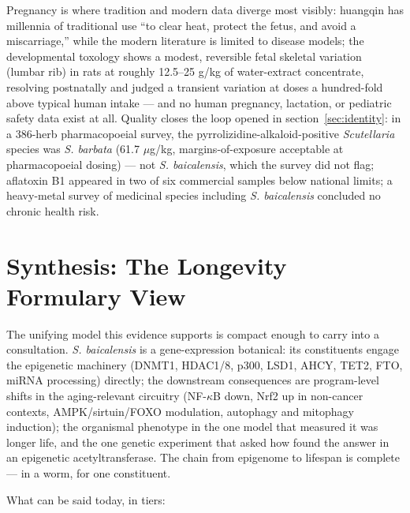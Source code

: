Pregnancy is where tradition and modern data diverge most visibly: huangqin has millennia of traditional use ``to clear heat, protect the fetus, and avoid a miscarriage,'' while the modern literature is limited to disease models; the developmental toxology shows a modest, reversible fetal skeletal variation (lumbar rib) in rats at roughly 12.5--25 g/kg of water-extract concentrate, resolving postnatally and judged a transient variation at doses a hundred-fold above typical human intake --- and no human pregnancy, lactation, or pediatric safety data exist at all. Quality closes the loop opened in section~\ref{sec:identity}: in a 386-herb pharmacopoeial survey, the pyrrolizidine-alkaloid-positive \textit{Scutellaria} species was \textit{S. barbata} (61.7 $\mu$g/kg, margins-of-exposure acceptable at pharmacopoeial dosing) --- not \textit{S. baicalensis}, which the survey did not flag; aflatoxin B1 appeared in two of six commercial samples below national limits; a heavy-metal survey of medicinal species including \textit{S. baicalensis} concluded no chronic health risk.

\section{Synthesis: The Longevity Formulary View}
\label{sec:synth}

The unifying model this evidence supports is compact enough to carry into a consultation. \textit{S. baicalensis} is a gene-expression botanical: its constituents engage the epigenetic machinery (DNMT1, HDAC1/8, p300, LSD1, AHCY, TET2, FTO, miRNA processing) directly; the downstream consequences are program-level shifts in the aging-relevant circuitry (NF-$\kappa$B down, Nrf2 up in non-cancer contexts, AMPK/sirtuin/FOXO modulation, autophagy and mitophagy induction); the organismal phenotype in the one model that measured it was longer life, and the one genetic experiment that asked how found the answer in an epigenetic acetyltransferase. The chain from epigenome to lifespan is complete --- in a worm, for one constituent.

What can be said today, in tiers:

